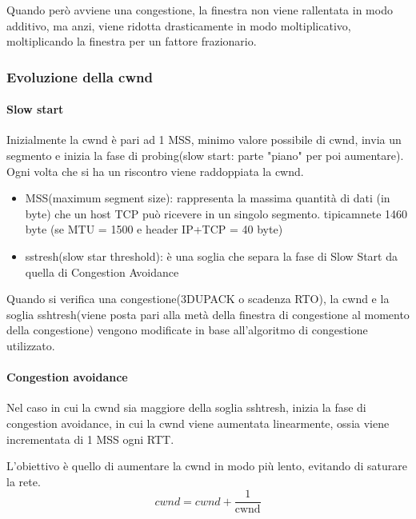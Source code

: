 Quando però avviene una congestione, la finestra non viene rallentata in modo additivo, ma anzi, viene ridotta drasticamente in modo moltiplicativo, moltiplicando la finestra per un fattore frazionario. 


\subsubsection{Evoluzione della cwnd}

        \paragraph{Slow start}
        Inizialmente la cwnd è pari ad 1 MSS, minimo valore possibile di cwnd, invia un segmento e inizia la fase di probing(slow start: parte "piano" per poi aumentare). Ogni volta che si ha un riscontro viene raddoppiata la cwnd. 

        \begin{itemize}
            \item MSS(maximum segment size): rappresenta la massima quantità di dati (in byte) che un host TCP può ricevere in un singolo segmento.
            tipicamnete 1460 byte (se MTU = 1500 e header IP+TCP = 40 byte)
            \item sstresh(slow star threshold): è una soglia che separa la fase di Slow Start da quella di Congestion Avoidance
        \end{itemize}

        Quando si verifica una congestione(3DUPACK o scadenza RTO), la cwnd e la soglia sshtresh(viene posta pari alla metà della finestra di congestione al momento della congestione) vengono modificate in base all'algoritmo di congestione utilizzato.

        \paragraph{Congestion avoidance}
        Nel caso in cui  la cwnd sia maggiore della soglia sshtresh, inizia la fase di congestion avoidance, in cui la cwnd viene aumentata linearmente, ossia viene incrementata di 1 MSS ogni RTT.

        L'obiettivo è quello di aumentare la cwnd in modo più lento, evitando di saturare la rete.
        \begin{equation}
            cwnd = cwnd + \frac{1}{\text{cwnd}}     \end{equation}
        
